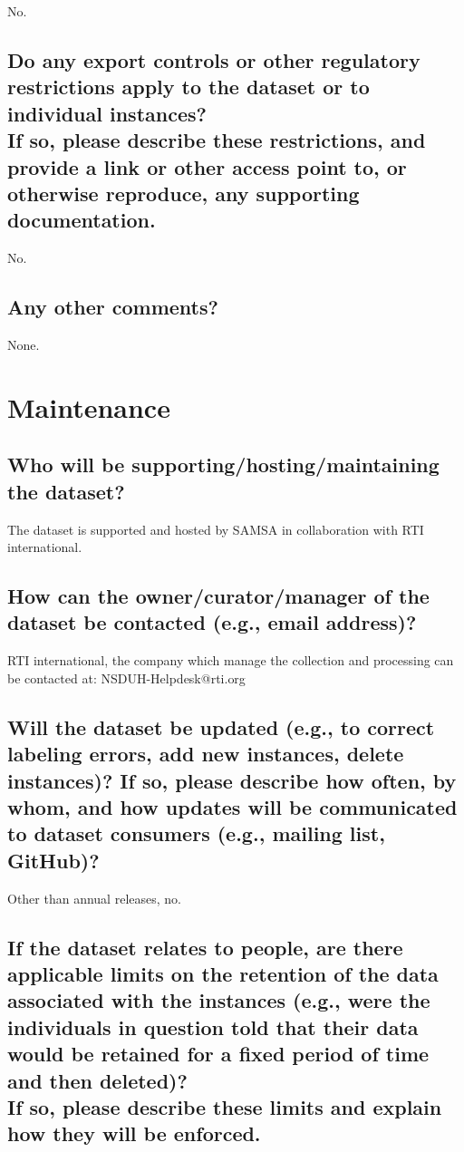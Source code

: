 \documentclass[letterpaper, 10 pt, conference]{ieeeconf}  %
\newcommand{\subtitle}[1]{{\\ \small \normalfont \color{purple} #1}}
\begin{document}
No.

\subsection{Do any export controls or other regulatory restrictions apply to the dataset or to individual instances? \subtitle{If so, please describe these restrictions, and provide a link or other access point to, or otherwise reproduce, any supporting documentation.}}

No.

\subsection{Any other comments?}

None.

\section{Maintenance}

\subsection{Who will be supporting/hosting/maintaining the dataset?}

The dataset is supported and hosted by SAMSA in collaboration with RTI international.

\subsection{How can the owner/curator/manager of the dataset be contacted (e.g., email address)?}

RTI international, the company which manage the collection and processing can be contacted at: NSDUH-Helpdesk@rti.org

\subsection{Will the dataset be updated (e.g., to correct labeling errors, add new instances, delete instances)? If so, please describe how often, by whom, and how updates will be communicated to dataset consumers (e.g., mailing list, GitHub)?}

Other than annual releases, no.

\subsection{If the dataset relates to people, are there applicable limits on the retention of the data associated with the instances (e.g., were the individuals in question told that their data would be retained for a fixed period of time and then deleted)? \subtitle{If so, please describe these limits and explain how they will be enforced.}}
\end{document}

